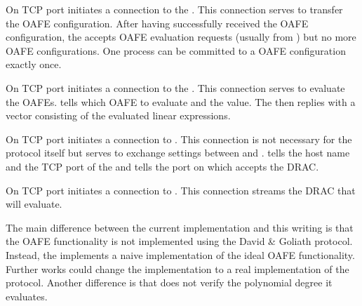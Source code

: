 %
%
\label{sec:communication-channels}


\label{sec:comm:goliath2Token}

On TCP port  \JWpOne{} initiates a connection to the \JWtoken{}.
This connection serves to transfer the OAFE configuration. After having
successfully received the OAFE configuration, the \JWtoken{} accepts OAFE
evaluation requests (usually from \JWpTwo{}) but no more OAFE configurations.
One \JWtoken{} process can be committed to a OAFE configuration exactly once.


\label{sec:comm:david2token}

On TCP port  \JWpTwo{} initiates a connection to the \JWtoken{}.
This connection serves to evaluate the OAFEs. \JWpTwo{} tells which
OAFE to evaluate and the value. The \JWtoken{} then replies with a vector
consisting of the evaluated linear expressions.


\label{sec:comm:david2goliath}

On TCP port  \JWpTwo{} initiates a connection to \JWpOne{}. This
connection is not necessary for the protocol itself but serves to exchange
settings between \JWpOne{} and \JWpTwo{}. \JWpOne{} tells \JWpTwo{} the host
name and the TCP port of the \JWtoken{} and \JWpTwo{} tells \JWpOne{} the port
on which \JWpTwo{} accepts the DRAC.


\label{sec:comm:goliath2david}

On TCP port  \JWpOne{} initiates a connection to \JWpTwo{}. This
connection streams the DRAC that \JWpTwo{} will evaluate.


%
%
\label{sec:implementation-differences}

The main difference between the current implementation and this writing is that
the OAFE functionality is not implemented using the David \& Goliath
\cite{davidgoliath} protocol. Instead, the \JWBtoken{} implements a naive
implementation of the ideal OAFE functionality. Further works could change the
implementation to a real implementation of the protocol. Another difference is
that \JWpTwo{} does not verify the polynomial degree it evaluates.


